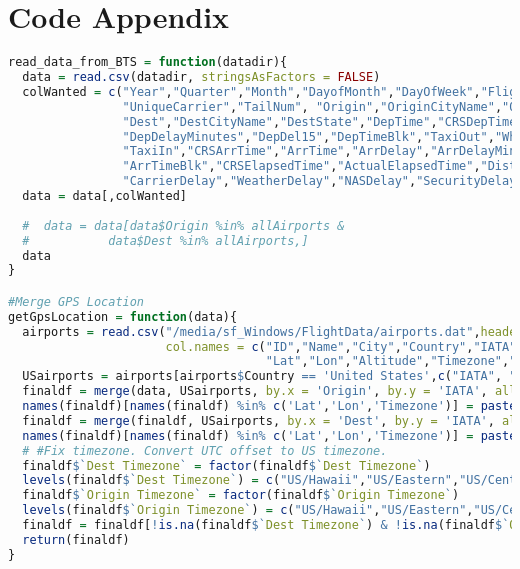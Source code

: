\documentclass[12pt]{article}
\begin{document}
\section{Code Appendix} \label{sec:Code Appendix} 
\begin{lstlisting}[language=R, caption=Data Merging in R]
read_data_from_BTS = function(datadir){
  data = read.csv(datadir, stringsAsFactors = FALSE)
  colWanted = c("Year","Quarter","Month","DayofMonth","DayOfWeek","FlightDate",
                "UniqueCarrier","TailNum", "Origin","OriginCityName","OriginState",
                "Dest","DestCityName","DestState","DepTime","CRSDepTime","DepDelay",
                "DepDelayMinutes","DepDel15","DepTimeBlk","TaxiOut","WheelsOff","WheelsOn",
                "TaxiIn","CRSArrTime","ArrTime","ArrDelay","ArrDelayMinutes","ArrDel15",
                "ArrTimeBlk","CRSElapsedTime","ActualElapsedTime","Distance","DistanceGroup","Cancelled","CancellationCode",
                "CarrierDelay","WeatherDelay","NASDelay","SecurityDelay","LateAircraftDelay","Diverted")
  data = data[,colWanted]
  
  #  data = data[data$Origin %in% allAirports & 
  #           data$Dest %in% allAirports,]
  data
}

#Merge GPS Location
getGpsLocation = function(data){
  airports = read.csv("/media/sf_Windows/FlightData/airports.dat",header = FALSE,
                      col.names = c("ID","Name","City","Country","IATA","ICAO",
                                    "Lat","Lon","Altitude","Timezone","DST","Tz","Type","Source"))
  USairports = airports[airports$Country == 'United States',c("IATA", "Lat","Lon","Timezone")]
  finaldf = merge(data, USairports, by.x = 'Origin', by.y = 'IATA', all.x = TRUE)
  names(finaldf)[names(finaldf) %in% c('Lat','Lon','Timezone')] = paste("Origin",c('Lat','Lon','Timezone'))
  finaldf = merge(finaldf, USairports, by.x = 'Dest', by.y = 'IATA', all.x = TRUE)
  names(finaldf)[names(finaldf) %in% c('Lat','Lon','Timezone')] = paste("Dest",c('Lat','Lon','Timezone'))
  # #Fix timezone. Convert UTC offset to US timezone.
  finaldf$`Dest Timezone` = factor(finaldf$`Dest Timezone`)
  levels(finaldf$`Dest Timezone`) = c("US/Hawaii","US/Eastern","US/Central","US/Mountain","US/Pacific","US/Alaska")
  finaldf$`Origin Timezone` = factor(finaldf$`Origin Timezone`)
  levels(finaldf$`Origin Timezone`) = c("US/Hawaii","US/Eastern","US/Central","US/Mountain","US/Pacific","US/Alaska")
  finaldf = finaldf[!is.na(finaldf$`Dest Timezone`) & !is.na(finaldf$`Origin Timezone`),]
  return(finaldf)
}


\end{lstlisting}
\end{document}

